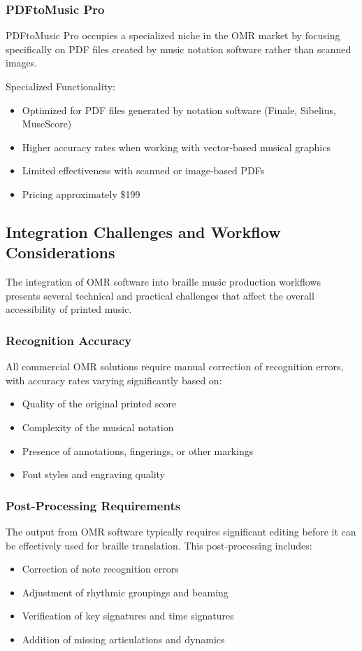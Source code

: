 \subsubsection{PDFtoMusic Pro}
PDFtoMusic Pro occupies a specialized niche in the OMR market by focusing specifically on PDF files created by music notation software rather than scanned images.

Specialized Functionality:
\begin{itemize}
    \item Optimized for PDF files generated by notation software (Finale, Sibelius, MuseScore)
    \item Higher accuracy rates when working with vector-based musical graphics
    \item Limited effectiveness with scanned or image-based PDFs
    \item Pricing approximately \$199
\end{itemize}

\subsection{Integration Challenges and Workflow Considerations}

The integration of OMR software into braille music production workflows presents several technical and practical challenges that affect the overall accessibility of printed music.

\subsubsection{Recognition Accuracy}
All commercial OMR solutions require manual correction of recognition errors, with accuracy rates varying significantly based on:
\begin{itemize}
    \item Quality of the original printed score
    \item Complexity of the musical notation
    \item Presence of annotations, fingerings, or other markings
    \item Font styles and engraving quality
\end{itemize}

\subsubsection{Post-Processing Requirements}
The output from OMR software typically requires significant editing before it can be effectively used for braille translation. This post-processing includes:
\begin{itemize}
    \item Correction of note recognition errors
    \item Adjustment of rhythmic groupings and beaming
    \item Verification of key signatures and time signatures
    \item Addition of missing articulations and dynamics
\end{itemize}

